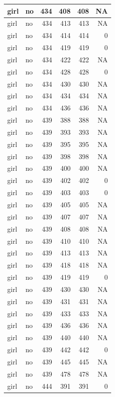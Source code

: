 \documentclass[man]{apa6}
\begin{document}
\begin{tabular}{l|l|r|r|r|r}
\hline
girl & no & 434 & 408 & 408 & NA\\
\hline
girl & no & 434 & 413 & 413 & NA\\
\hline
girl & no & 434 & 414 & 414 & 0\\
\hline
girl & no & 434 & 419 & 419 & 0\\
\hline
girl & no & 434 & 422 & 422 & NA\\
\hline
girl & no & 434 & 428 & 428 & 0\\
\hline
girl & no & 434 & 430 & 430 & NA\\
\hline
girl & no & 434 & 434 & 434 & NA\\
\hline
girl & no & 434 & 436 & 436 & NA\\
\hline
girl & no & 439 & 388 & 388 & NA\\
\hline
girl & no & 439 & 393 & 393 & NA\\
\hline
girl & no & 439 & 395 & 395 & NA\\
\hline
girl & no & 439 & 398 & 398 & NA\\
\hline
girl & no & 439 & 400 & 400 & NA\\
\hline
girl & no & 439 & 402 & 402 & 0\\
\hline
girl & no & 439 & 403 & 403 & 0\\
\hline
girl & no & 439 & 405 & 405 & NA\\
\hline
girl & no & 439 & 407 & 407 & NA\\
\hline
girl & no & 439 & 408 & 408 & NA\\
\hline
girl & no & 439 & 410 & 410 & NA\\
\hline
girl & no & 439 & 413 & 413 & NA\\
\hline
girl & no & 439 & 418 & 418 & NA\\
\hline
girl & no & 439 & 419 & 419 & 0\\
\hline
girl & no & 439 & 430 & 430 & NA\\
\hline
girl & no & 439 & 431 & 431 & NA\\
\hline
girl & no & 439 & 433 & 433 & NA\\
\hline
girl & no & 439 & 436 & 436 & NA\\
\hline
girl & no & 439 & 440 & 440 & NA\\
\hline
girl & no & 439 & 442 & 442 & 0\\
\hline
girl & no & 439 & 445 & 445 & NA\\
\hline
girl & no & 439 & 478 & 478 & NA\\
\hline
girl & no & 444 & 391 & 391 & 0\\

\end{tabular}
\end{document}
